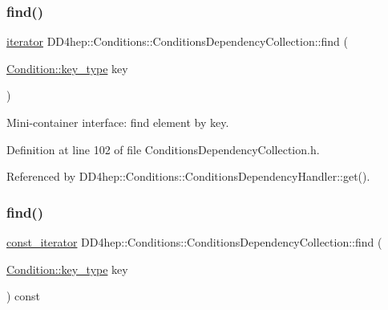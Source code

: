 \subsubsection{\texorpdfstring{find()}{find()}\hspace{0.1cm}{\footnotesize\ttfamily [1/2]}}
{\footnotesize\ttfamily \hyperlink{class_d_d4hep_1_1_conditions_1_1_conditions_dependency_collection_a685a1a6841f2fa4d70ab9a9bfb7b0b6a}{iterator} D\+D4hep\+::\+Conditions\+::\+Conditions\+Dependency\+Collection\+::find (\begin{DoxyParamCaption}\item[{\hyperlink{class_d_d4hep_1_1_conditions_1_1_condition_a7528efa762e8cc072ef80ea67c3531f9}{Condition\+::key\+\_\+type}}]{key }\end{DoxyParamCaption})\hspace{0.3cm}{\ttfamily [inline]}}



Mini-\/container interface\+: find element by key. 



Definition at line 102 of file Conditions\+Dependency\+Collection.\+h.



Referenced by D\+D4hep\+::\+Conditions\+::\+Conditions\+Dependency\+Handler\+::get().

\hypertarget{class_d_d4hep_1_1_conditions_1_1_conditions_dependency_collection_a17aa7289b666f323bcf5f077a60abad2}{}\label{class_d_d4hep_1_1_conditions_1_1_conditions_dependency_collection_a17aa7289b666f323bcf5f077a60abad2} 
\subsubsection{\texorpdfstring{find()}{find()}\hspace{0.1cm}{\footnotesize\ttfamily [2/2]}}
{\footnotesize\ttfamily \hyperlink{class_d_d4hep_1_1_conditions_1_1_conditions_dependency_collection_ab5e9bcdc3330c3b694303f627799dc84}{const\+\_\+iterator} D\+D4hep\+::\+Conditions\+::\+Conditions\+Dependency\+Collection\+::find (\begin{DoxyParamCaption}\item[{\hyperlink{class_d_d4hep_1_1_conditions_1_1_condition_a7528efa762e8cc072ef80ea67c3531f9}{Condition\+::key\+\_\+type}}]{key }\end{DoxyParamCaption}) const\hspace{0.3cm}{\ttfamily [inline]}}



